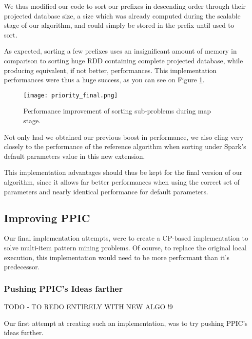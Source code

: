 \documentclass{eplmastersthesis}
\begin{document}
We thus modified our code to sort our prefixes in descending order through their projected database size, a size which was already computed during the scalable stage of our algorithm, and could simply be stored in the prefix until used to sort. \newline

As expected, sorting a few prefixes uses an insignificant amount of memory in comparison to sorting huge RDD containing complete projected database, while producing equivalent, if not better, performances. This implementation performances were thus a huge success, as you can see on Figure \ref{fig:priority_scheduling_improved}. \newline

\begin{figure}[h]
  \centering
  \texttt{[image: priority\_final.png]}
  \caption{Performance improvement of sorting sub-problems during map stage.}
  \label{fig:priority_scheduling_improved}
\end{figure}

Not only had we obtained our previous boost in performance, we also cling very closely to the performance of the reference algorithm when sorting under Spark's default parameters value in this new extension. \newline

This implementation advantages should thus be kept for the final version of our algorithm, since it allows far better performances when using the correct set of parameters and nearly identical performance for default parameters.

\subsection{Improving PPIC}

Our final implementation attempts, were to create a CP-based implementation to solve multi-item pattern mining problems. Of course, to replace the original local execution, this implementation would need to be more performant than it's predecessor.

\subsubsection{Pushing PPIC's Ideas farther}

TODO - TO REDO ENTIRELY WITH NEW ALGO !9

Our first attempt at creating such an implementation, was to try pushing PPIC's ideas further. \newline
\end{document}

